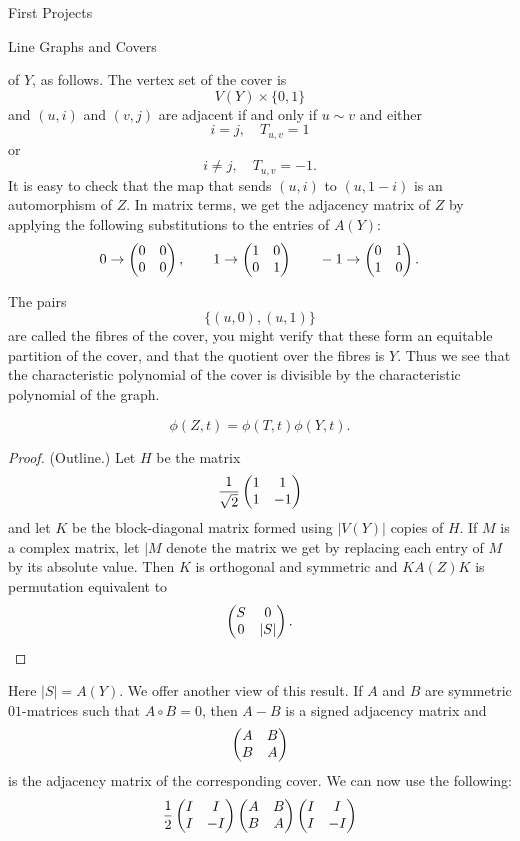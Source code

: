 \begin{chap}{First Projects}
\begin{sect}{Line Graphs and Covers}
\begin{para}
of $Y$, as follows. The vertex set of the cover is
\[
    V(Y) \times \{0,1\}
\]
and $(u,i)$ and $(v,j)$ are adjacent if and only if $u\sim v$ and either
\[
    i=j,\quad T_{u,v}=1
\]
or
\[
    i\ne j,\quad T_{u,v}=-1.
\]
It is easy to check that the map that sends $(u,i)$ to $(u,1-i)$ is an automorphism
of $Z$. In matrix terms, we get the adjacency matrix of $Z$ by applying
the following substitutions to the entries of $A(Y)$:
\[
    0\to\begin{pmatrix} 0&0\\0&0 \end{pmatrix},\qquad 1\to\begin{pmatrix} 1&0\\0&1 \end{pmatrix}
        \qquad -1\to\begin{pmatrix} 0&1\\1&0 \end{pmatrix}.
\]
\end{para}
%
\begin{para}
The pairs 
\[
    \{(u,0),(u,1)\}
\]
are called the fibres of the cover, you might verify that these form an equitable
partition of the cover, and that the quotient over the fibres is $Y$. Thus
we see that the characteristic polynomial of the cover is divisible
by the characteristic polynomial of the graph.
\end{para}
%
\begin{para}
%
\begin{lemma}
\begin{statement}
\[
        \phi(Z,t) =\phi(T,t)\phi(Y,t).
\]
\end{statement}    
\begin{proof}
(Outline.) Let $H$ be the matrix
\[
    \frac{1}{\sqrt{2}} \begin{pmatrix} 1&1\\1&-1 \end{pmatrix}
\]
and let $K$ be the block-diagonal matrix formed using $|V(Y)|$ copies of $H$.
If $M$ is a complex matrix, let $|M$ denote the matrix we get by replacing each entry
of $M$ by its absolute value.
Then $K$ is orthogonal and symmetric and $KA(Z)K$ is permutation equivalent to 
\[
    \begin{pmatrix} S&0\\0&|S| \end{pmatrix}.
\]
\end{proof}
\end{lemma}
\end{para}
%
\begin{para}
Here $|S|=A(Y)$. We offer another view of this result.
If $A$ and $B$ are symmetric $01$-matrices such that $A\circ B=0$,
then $A-B$ is a signed adjacency matrix and
\[
    \begin{pmatrix} A&B\\B&A \end{pmatrix}
\]
is the adjacency matrix of the corresponding cover.
We can now use the following:
\[
    \frac12\begin{pmatrix} I&I\\I&-I \end{pmatrix}\begin{pmatrix} A&B\\B&A \end{pmatrix}\begin{pmatrix} I&I\\I&-I \end{pmatrix}
\]
\end{para}
\end{sect}
\end{chap}
